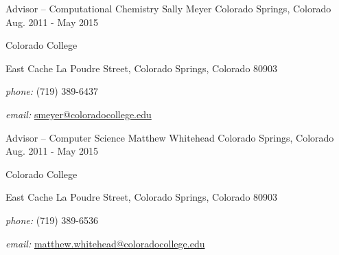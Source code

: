 \begin{cventries}
  \cventry
    {Advisor -- Computational Chemistry}
    {Sally Meyer}
    {Colorado Springs, Colorado}
    {Aug. 2011 - May 2015}
    {
        \begin{cvitems}
        \item[] \quad Colorado College
        \item[]  East Cache La Poudre Street, Colorado Springs, Colorado 80903
        \item[] \quad \textit{phone:} (719) 389-6437
        \item[] \quad \textit{email:} \href{mailto:smeyer@coloradocollege.edu}{smeyer@coloradocollege.edu}
        \end{cvitems}
    }

  \cventry
    {Advisor -- Computer Science}
    {Matthew Whitehead}
    {Colorado Springs, Colorado}
    {Aug. 2011 - May 2015}
    {
        \begin{cvitems}
        \item[] \quad Colorado College
        \item[]  East Cache La Poudre Street, Colorado Springs, Colorado 80903
        \item[] \quad \textit{phone:} (719) 389-6536
        \item[] \quad \textit{email:} \href{mailto:matthew.whitehead@coloradocollege.edu}{matthew.whitehead@coloradocollege.edu}
        \end{cvitems}
    }

\end{cventries}
